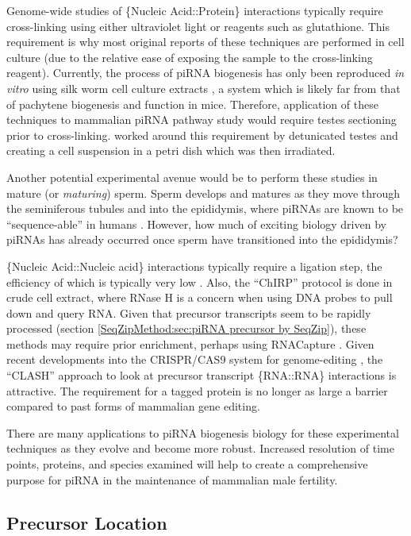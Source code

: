     Genome-wide studies of \{Nucleic Acid::Protein\} interactions typically require cross-linking \citep{Chodosh2001} using either ultraviolet light or reagents such as glutathione. This requirement is why most original reports of these techniques are performed in cell culture (due to the relative ease of exposing the sample to the cross-linking reagent). Currently, the process of piRNA biogenesis has only been reproduced \textit{in vitro} using silk worm cell culture extracts \citep{Kawaoka2009,Kawaoka2011}, a system which is likely far from that of pachytene biogenesis and function in mice. Therefore, application of these techniques to mammalian piRNA pathway study would require testes sectioning prior to cross-linking. \citep{Vourekas2012} worked around this requirement by detunicated testes and creating a cell suspension in a petri dish which was then irradiated.

    Another potential experimental avenue would be to perform these studies in mature (or \textit{maturing}) sperm. Sperm develops and matures as they move through the seminiferous tubules and into the epididymis, where piRNAs are known to be ``sequence-able'' in humans \citep{Jones1999,Li2012a}. However, how much of exciting biology driven by piRNAs has already occurred once sperm have transitioned into the epididymis?

    \{Nucleic Acid::Nucleic acid\} interactions typically require a ligation step, the efficiency of which is typically very low \citep{Helwak2014}. Also, the ``ChIRP'' protocol is done in crude cell extract, where RNase H is a concern when using DNA probes to pull down and query RNA. Given that precursor transcripts seem to be rapidly processed (section \ref{SeqZipMethod:sec:piRNA precursor by SeqZip}), these methods may require prior enrichment, perhaps using RNACapture \citep{Mercer2014}. Given recent developments into the CRISPR/CAS9 system for genome-editing \citep{Sander2014}, the ``CLASH'' approach to look at precursor transcript \{RNA::RNA\} interactions is attractive. The requirement for a tagged protein is no longer as large a barrier compared to past forms of mammalian gene editing.

    There are many applications to piRNA biogenesis biology for these experimental techniques as they evolve and become more robust. Increased resolution of time points, proteins, and species examined will help to create a comprehensive purpose for piRNA in the maintenance of mammalian male fertility.

  \subsection{Precursor Location}
    \label{Disc:subsec:Imaging of precursors}

